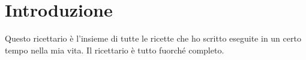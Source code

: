 \section{Introduzione}

Questo ricettario è l'insieme di tutte le ricette che ho scritto eseguite in un certo tempo nella mia vita. Il ricettario è tutto fuorché completo.